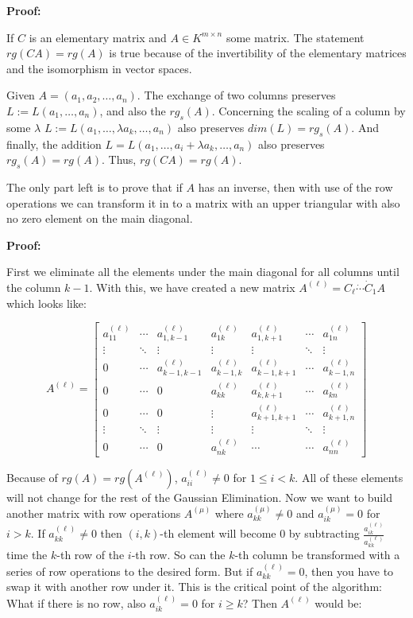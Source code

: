 \textbf{Proof:}

If \(C\) is an elementary matrix and \(A \in K^{m \times n}\) some matrix. The statement \(rg(CA) = rg(A)\) 
is true because of the invertibility of the elementary matrices and the isomorphism in vector spaces.

Given \(A = (a_1, a_2, \dots, a_n)\). The exchange of two columns preserves \(L := L(a_1, \dots, a_n)\), 
and also the \(rg_s (A)\). Concerning the scaling of a column by some \(\lambda \) \(L := L(a_1, \dots, \lambda a_k, \dots, a_n)\) 
also preserves \(dim(L) = rg_s(A)\). And finally, the addition \(L = L(a_1, \dots, a_i + \lambda a_k, \dots, a_n)\) also preserves 
\(rg_s (A) = rg(A)\). Thus, \(rg(CA) = rg(A)\).

\QED

The only part left is to prove that if \(A\) has an inverse, then with use of the row operations we can 
transform it in to a matrix with an upper triangular with also no zero element on the main diagonal.

\textbf{Proof:}

First we eliminate all the elements under the main diagonal for all columns until the column \(k - 1\).
With this, we have created a new matrix \(A^(\ell) = C_{\ell} \dot \cdots \dot C_1 A \) which looks 
like: 

\[
	A^{(\ell)} =
	\begin{bmatrix}
	a^{(\ell)}_{11} & \cdots & a^{(\ell)}_{1,k-1} & a^{(\ell)}_{1k} & a^{(\ell)}_{1,k+1} & \cdots & a^{(\ell)}_{1n} \\
	\vdots & \ddots & \vdots & \vdots & \vdots & \ddots & \vdots \\
	0 & \cdots & a^{(\ell)}_{k-1,k-1} & a^{(\ell)}_{k-1,k} & a^{(\ell)}_{k-1,k+1} & \cdots & a^{(\ell)}_{k-1,n} \\
	0 & \cdots & 0 & a^{(\ell)}_{kk} & a^{(\ell)}_{k,k+1} & \cdots & a^{(\ell)}_{kn} \\
	0 & \cdots & 0 & \vdots & a^{(\ell)}_{k+1,k+1} & \cdots & a^{(\ell)}_{k+1,n} \\
	\vdots & \ddots & \vdots & \vdots & \vdots & \ddots & \vdots \\
	0 & \cdots & 0 & a^{(\ell)}_{nk} & \cdots & \cdots & a^{(\ell)}_{nn}
	\end{bmatrix}
\]

Because of \(rg(A) = rg(A^{(\ell)})\), \(a^{(\ell)}_{ii} \ne 0\) for \(1 \le i < k\). All of these 
elements will not change for the rest of the Gaussian Elimination. Now we want to build another matrix 
with row operations \(A^{(\mu)}\) where \(a^{(\mu)}_{kk} \ne 0\) and \(a^{(\mu)}_{ik} = 0\) for 
\(i > k\). If \(a^{(\ell)}_{kk} \ne 0\) then \((i,k)\)-th element will become 0 by subtracting 
\(\frac{a^{(\ell)}_{ik}}{a^{(\ell)}_{kk}}\) time the \(k\)-th row of the \(i\)-th row. So can the \(k\)-th 
column be transformed with a series of row operations to the desired form. But if \(a^{(\ell)}_{kk} = 0\), 
then you have to swap it with another row under it. This is the critical point of the algorithm: What 
if there is no row, also \(a^{(\ell)}_{ik} = 0\) for \(i \ge k\)? Then \(A^{(\ell)}\) would be:

